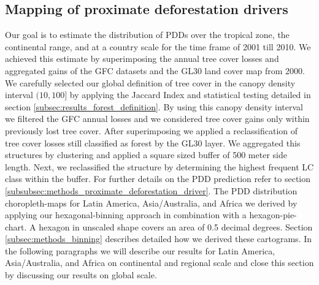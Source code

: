 		\subsection{Mapping of proximate deforestation drivers}
		\label{subsec:results_proxy_deforestation_drivers}
			Our goal is to estimate the distribution of \acp{PDD} over the tropical zone, the continental range, and at a country scale for the time frame of 2001 till 2010. We achieved this estimate by superimposing the annual tree cover losses and aggregated gains of the \ac{GFC} datasets and the \ac{GL30} land cover map from 2000. We carefully selected our global definition of tree cover in the canopy density interval $(10,100]$ by applying the Jaccard Index and statistical testing detailed in section \ref{subsec:results_forest_definition}. By using this canopy density interval we filtered the \ac{GFC} annual losses and we considered tree cover gains only within previously lost tree cover. After superimposing we applied a reclassification of tree cover losses still classified as forest by the \ac{GL30} layer. We aggregated this structures by clustering and applied a square sized buffer of 500 meter side length. Next, we reclassified the structure by determining the highest frequent \ac{LC} class within the buffer. For further details on the \ac{PDD} prediction refer to section \ref{subsubsec:methods_proximate_deforestation_driver}. The \ac{PDD} distribution choropleth-maps for Latin America, Asia/Australia, and Africa we derived by applying our hexagonal-binning approach in combination with a hexagon-pie-chart. A hexagon in unscaled shape covers an area of 0.5 decimal degrees. Section \ref{subsec:methods_binning} describes detailed how we derived these cartograms. In the following paragraphs we will describe our results for Latin America, Asia/Australia, and Africa on continental and regional scale and close this section by discussing our results on global scale.

